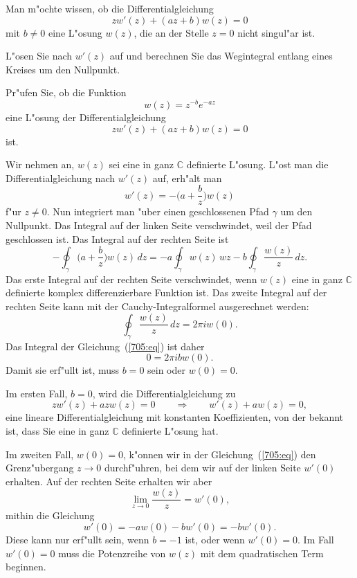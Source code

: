 Man m"ochte wissen, ob die Differentialgleichung
\[
zw'(z)+(az+b)w(z)=0
\]
mit $b\ne 0$ eine L"osung $w(z)$, die an der Stelle $z=0$
nicht singul"ar ist.

\begin{hinweis}
L"osen Sie nach $w'(z)$ auf und berechnen Sie das Wegintegral
entlang eines Kreises um den Nullpunkt.

Pr"ufen Sie, ob die Funktion
\[
w(z) = z^{-b}e^{-az}
\]
eine L"osung der Differentialgleichung
\[
zw'(z)+(az+b)w(z)=0
\]
ist.
\end{hinweis}

\begin{loesung}
Wir nehmen an, $w(z)$ sei eine in ganz $\mathbb C$ definierte L"osung.
L"ost man die Differentialgleichung nach $w'(z)$ auf, erh"alt man
\begin{equation}
w'(z) = -\biggl(a+\frac{b}z\biggr)w(z)
\label{705:eq}
\end{equation}
f"ur $z\ne 0$.
Nun integriert man "uber einen geschlossenen Pfad $\gamma$ um den 
Nullpunkt.
Das Integral auf der linken Seite verschwindet, weil der Pfad geschlossen
ist.
Das Integral auf der rechten Seite ist 
\[
-\oint_\gamma 
\biggl(a+\frac{b}z\biggr)w(z)\,dz
=
-a\oint_\gamma w(z)\,wz
-
b\oint_\gamma \frac{w(z)}z\,dz.
\]
Das erste Integral auf der rechten Seite verschwindet, wenn $w(z)$ eine
in ganz $\mathbb C$ definierte komplex differenzierbare Funktion ist.
Das zweite Integral auf der rechten Seite kann mit der Cauchy-Integralformel
ausgerechnet werden:
\[
\oint_\gamma \frac{w(z)}z\,dz
=
2\pi i w(0).
\]
Das Integral der Gleichung~(\ref{705:eq}) ist daher
\[
0=2\pi i b w(0).
\]
Damit sie erf"ullt ist, muss $b=0$ sein oder $w(0)=0$.

Im ersten Fall, $b=0$, wird die Differentialgleichung zu
\[
zw'(z)+azw(z)=0
\qquad\Rightarrow\qquad
w'(z)+aw(z)=0,
\]
eine lineare Differentialgleichung mit konstanten Koeffizienten, von der
bekannt ist, dass Sie eine in ganz $\mathbb C$ definierte L"osung hat.

Im zweiten Fall, $w(0)=0$, k"onnen wir in der Gleichung~(\ref{705:eq}) 
den Grenz"ubergang $z\to 0$ durchf"uhren, bei dem wir auf der
linken Seite $w'(0)$ erhalten.
Auf der rechten Seite erhalten wir aber
\[
 \lim_{z\to 0}\frac{w(z)}{z}=w'(0),
\]
mithin die Gleichung
\[
w'(0)=-aw(0)-bw'(0)=-bw'(0).
\]
Diese kann nur erf"ullt sein, wenn $b=-1$ ist, oder wenn $w'(0)=0$.
Im Fall $w'(0)=0$ muss die Potenzreihe von $w(z)$ mit dem quadratischen
Term beginnen.
\end{loesung}

